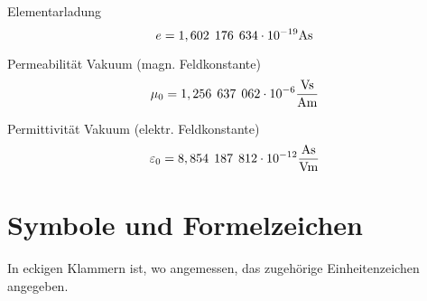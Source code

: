 \documentclass[11pt, a4paper, draft, fleqn, twocolumn]{article}
\numberwithin{equation}{subsection}
\begin{document}
Elementarladung\footnotemark[1]
\begin{equation}
    e = 1,602 \hspace{1ex} 176 \hspace{1ex} 634 \cdot 10^{-19} \text{As}
\end{equation}

\noindent Permeabilität Vakuum (magn. Feldkonstante)\footnotemark[1]
\begin{equation}
    \mu_0 = 1,256 \hspace{1ex} 637 \hspace{1ex} 062 \cdot 10^{-6} \frac{\text{Vs}}{\text{Am}}
\end{equation}

\noindent Permittivität Vakuum (elektr. Feldkonstante)\footnotemark[1]
\begin{equation}
    \varepsilon_0 = 8,854 \hspace{1ex} 187 \hspace{1ex} 812 \cdot 10^{-12} \frac{\text{As}}{\text{Vm}}
\end{equation}




\section{Symbole und Formelzeichen}
\noindent In eckigen Klammern ist, wo angemessen, das zugehörige Einheitenzeichen angegeben. \\
\end{document}
